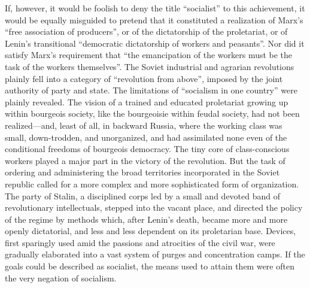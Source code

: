 If, however, it would be foolish to deny the title ``socialist'' to this achievement, it would be equally misguided to pretend that it constituted a realization of Marx's ``free association of producers'', or of the dictatorship of the proletariat, or of Lenin's transitional ``democratic dictatorship of workers and peasants''. Nor did it satisfy Marx's requirement that ``the emancipation of the workers must be the task of the workers themselves''. The Soviet industrial and agrarian revolutions plainly fell into a category of ``revolution from above'', imposed by the joint authority of party and state. The limitations of ``socialism in one country'' were plainly revealed. The vision of a trained and educated proletariat growing up within bourgeois society, like the bourgeoisie within feudal society, had not been realized---and, least of all, in backward Russia, where the working class was small, down-trodden, and unorganized, and had assimilated none even of the conditional freedoms of bourgeois democracy. The tiny core of class-conscious workers played a major part in the victory of the revolution. But the task of ordering and administering the broad territories incorporated in the Soviet republic called for a more complex and more sophisticated form of organization. The party of Stalin, a disciplined corps led by a small and devoted band of revolutionary intellectuals, stepped into the vacant place, and directed the policy of the regime by methods which, after Lenin's death, became more and more openly dictatorial, and less and less dependent on its proletarian base. Devices, first sparingly used amid the passions and atrocities of the civil war, were gradually elaborated into a vast system of purges and concentration camps. If the goals could be described as socialist, the means used to attain them were often the very negation of socialism. 

